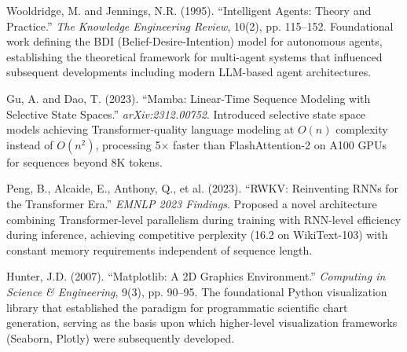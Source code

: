 \documentclass[a4paper,12pt,openany]{report}
\begin{document}
\begin{enumerate}[label={[\arabic*]}, leftmargin=2cm]
\item Wooldridge, M. and Jennings, N.R. (1995). ``Intelligent Agents: Theory and Practice.'' \textit{The Knowledge Engineering Review}, 10(2), pp. 115--152. Foundational work defining the BDI (Belief-Desire-Intention) model for autonomous agents, establishing the theoretical framework for multi-agent systems that influenced subsequent developments including modern LLM-based agent architectures.

\item Gu, A. and Dao, T. (2023). ``Mamba: Linear-Time Sequence Modeling with Selective State Spaces.'' \textit{arXiv:2312.00752}. Introduced selective state space models achieving Transformer-quality language modeling at $O(n)$ complexity instead of $O(n^2)$, processing 5$\times$ faster than FlashAttention-2 on A100 GPUs for sequences beyond 8K tokens.

\item Peng, B., Alcaide, E., Anthony, Q., et al. (2023). ``RWKV: Reinventing RNNs for the Transformer Era.'' \textit{EMNLP 2023 Findings}. Proposed a novel architecture combining Transformer-level parallelism during training with RNN-level efficiency during inference, achieving competitive perplexity (16.2 on WikiText-103) with constant memory requirements independent of sequence length.

\item Hunter, J.D. (2007). ``Matplotlib: A 2D Graphics Environment.'' \textit{Computing in Science \& Engineering}, 9(3), pp. 90--95. The foundational Python visualization library that established the paradigm for programmatic scientific chart generation, serving as the basis upon which higher-level visualization frameworks (Seaborn, Plotly) were subsequently developed.

\end{enumerate}

\end{document}
